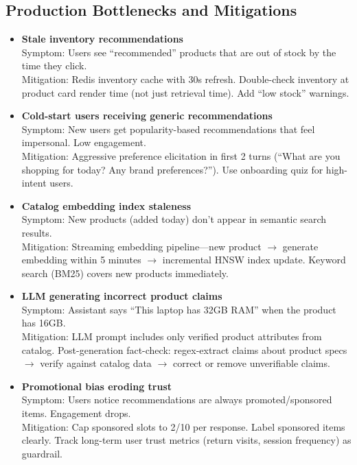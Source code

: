 \subsection*{Production Bottlenecks and Mitigations}

\begin{itemize}
  \item \textbf{Stale inventory recommendations}\\
    Symptom: Users see ``recommended'' products that are out of stock by the time they click.\\
    Mitigation: Redis inventory cache with 30s refresh. Double-check inventory at product card render time (not just retrieval time). Add ``low stock'' warnings.

  \item \textbf{Cold-start users receiving generic recommendations}\\
    Symptom: New users get popularity-based recommendations that feel impersonal. Low engagement.\\
    Mitigation: Aggressive preference elicitation in first 2 turns (``What are you shopping for today? Any brand preferences?''). Use onboarding quiz for high-intent users.

  \item \textbf{Catalog embedding index staleness}\\
    Symptom: New products (added today) don't appear in semantic search results.\\
    Mitigation: Streaming embedding pipeline---new product $\rightarrow$ generate embedding within 5 minutes $\rightarrow$ incremental HNSW index update. Keyword search (BM25) covers new products immediately.

  \item \textbf{LLM generating incorrect product claims}\\
    Symptom: Assistant says ``This laptop has 32GB RAM'' when the product has 16GB.\\
    Mitigation: LLM prompt includes only verified product attributes from catalog. Post-generation fact-check: regex-extract claims about product specs $\rightarrow$ verify against catalog data $\rightarrow$ correct or remove unverifiable claims.

  \item \textbf{Promotional bias eroding trust}\\
    Symptom: Users notice recommendations are always promoted/sponsored items. Engagement drops.\\
    Mitigation: Cap sponsored slots to 2/10 per response. Label sponsored items clearly. Track long-term user trust metrics (return visits, session frequency) as guardrail.


\end{itemize}
